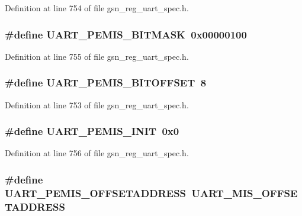 Definition at line 754 of file gsn\_\-reg\_\-uart\_\-spec.h.

\hypertarget{a00575_aa8f1afcf892684eb3a553e6044ab09fa}{
\subsubsection[{UART\_\-PEMIS\_\-BITMASK}]{\setlength{\rightskip}{0pt plus 5cm}\#define UART\_\-PEMIS\_\-BITMASK~0x00000100}}
\label{a00575_aa8f1afcf892684eb3a553e6044ab09fa}


Definition at line 755 of file gsn\_\-reg\_\-uart\_\-spec.h.

\hypertarget{a00575_a3b158a3798b70b280e5970f3efea25b3}{
\subsubsection[{UART\_\-PEMIS\_\-BITOFFSET}]{\setlength{\rightskip}{0pt plus 5cm}\#define UART\_\-PEMIS\_\-BITOFFSET~8}}
\label{a00575_a3b158a3798b70b280e5970f3efea25b3}


Definition at line 753 of file gsn\_\-reg\_\-uart\_\-spec.h.

\hypertarget{a00575_a3c9e69398394f1277449b7c54abdbbba}{
\subsubsection[{UART\_\-PEMIS\_\-INIT}]{\setlength{\rightskip}{0pt plus 5cm}\#define UART\_\-PEMIS\_\-INIT~0x0}}
\label{a00575_a3c9e69398394f1277449b7c54abdbbba}


Definition at line 756 of file gsn\_\-reg\_\-uart\_\-spec.h.

\hypertarget{a00575_a5e460a81506f212bdc5d691b09a8917e}{
\subsubsection[{UART\_\-PEMIS\_\-OFFSETADDRESS}]{\setlength{\rightskip}{0pt plus 5cm}\#define UART\_\-PEMIS\_\-OFFSETADDRESS~UART\_\-MIS\_\-OFFSETADDRESS}}
\label{a00575_a5e460a81506f212bdc5d691b09a8917e}


